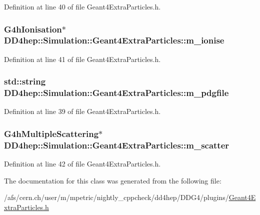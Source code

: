 Definition at line 40 of file Geant4ExtraParticles.h.\hypertarget{class_d_d4hep_1_1_simulation_1_1_geant4_extra_particles_a3a1a935a2a36d8e61af6c632fa7b847b}{
\subsubsection[{m\_\-ionise}]{\setlength{\rightskip}{0pt plus 5cm}G4hIonisation$\ast$ {\bf DD4hep::Simulation::Geant4ExtraParticles::m\_\-ionise}}}
\label{class_d_d4hep_1_1_simulation_1_1_geant4_extra_particles_a3a1a935a2a36d8e61af6c632fa7b847b}


Definition at line 41 of file Geant4ExtraParticles.h.\hypertarget{class_d_d4hep_1_1_simulation_1_1_geant4_extra_particles_ac50ed0b5305835df3be2537c93483d6b}{
\subsubsection[{m\_\-pdgfile}]{\setlength{\rightskip}{0pt plus 5cm}std::string {\bf DD4hep::Simulation::Geant4ExtraParticles::m\_\-pdgfile}}}
\label{class_d_d4hep_1_1_simulation_1_1_geant4_extra_particles_ac50ed0b5305835df3be2537c93483d6b}


Definition at line 39 of file Geant4ExtraParticles.h.\hypertarget{class_d_d4hep_1_1_simulation_1_1_geant4_extra_particles_ac682ea9380ab2726b966bd9829b279c4}{
\subsubsection[{m\_\-scatter}]{\setlength{\rightskip}{0pt plus 5cm}G4hMultipleScattering$\ast$ {\bf DD4hep::Simulation::Geant4ExtraParticles::m\_\-scatter}}}
\label{class_d_d4hep_1_1_simulation_1_1_geant4_extra_particles_ac682ea9380ab2726b966bd9829b279c4}


Definition at line 42 of file Geant4ExtraParticles.h.

The documentation for this class was generated from the following file:\begin{DoxyCompactItemize}
\item 
/afs/cern.ch/user/m/mpetric/nightly\_\-cppcheck/dd4hep/DDG4/plugins/\hyperlink{_geant4_extra_particles_8h}{Geant4ExtraParticles.h}\end{DoxyCompactItemize}
